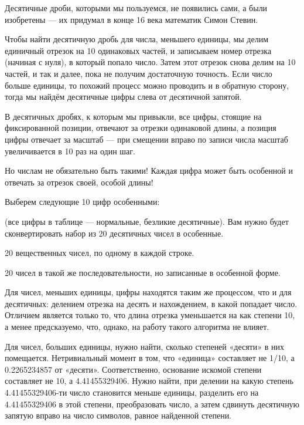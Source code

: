 
Десятичные дроби, которыми мы пользуемся, не появились сами, а были изобретены — их придумал в конце 16 века математик Симон Стевин.

Чтобы найти десятичную дробь для числа, меньшего единицы, мы делим единичный отрезок на 10 одинаковых частей, и записываем номер отрезка (начиная с нуля), в который попало число. Затем этот отрезок снова делим на 10 частей, и так и далее, пока не получим достаточную точность. Если число больше единицы, то похожий процесс можно проводить и в обратную сторону, тогда мы найдём десятичные цифры слева от десятичной запятой.

В десятичных дробях, к которым мы привыкли, все цифры, стоящие на фиксированной позиции, отвечают за отрезки одинаковой длины, а позиция цифры отвечает за масштаб — при смещении вправо по записи числа масштаб увеличивается в 10 раз на один шаг.

Но числам не обязательно быть такими! Каждая цифра может быть особенной и отвечать за отрезок своей, особой длины!

Выберем следующие 10 цифр особенными:


(все цифры в таблице — нормальные, безликие десятичные).
Вам нужно будет сконвертировать набор из 20 десятичных чисел в особенные.


20 вещественных чисел, по одному в каждой строке.

\outputfmtSection

20 чисел в такой же последовательности, но записанные в особенной форме.

\solutionSection

Для чисел, меньших единицы, цифры находятся таким же процессом, что и для десятичных: делением отрезка на десять и нахождением, в какой попадает число. Отличием является только то, что длина отрезка уменьшается на как степени 10, а менее предсказуемо, что, однако, на работу такого алгоритма не влияет.

Для чисел, больших единицы, нужно найти, сколько степеней «десяти» в них помещается. Нетривиальный момент в том, что «единица» составляет не 1/10, а 0.2265234857 от «десяти». Соответственно, основание искомой степени составляет не 10, а 4.41455329406. Нужно найти, при делении на какую степень 4.41455329406-ти число становится меньше единицы, разделить его на 4.41455329406 в этой степени, преобразовать число, а затем сдвинуть десятичную запятую вправо на число символов, равное найденной степени.


